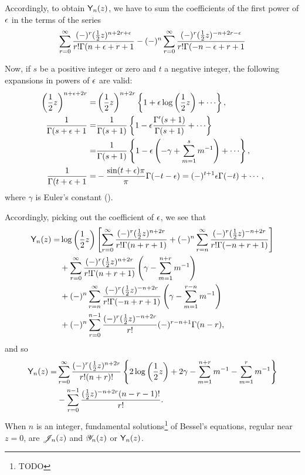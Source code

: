 \documentclass{book}
\begin{document}
Accordingly, to obtain $\mathsf{Y}_n(z)$, we have to sum the
coefficients of the first power of $\epsilon$ in the terms of the
series
$$
\sum_{r=0}^{\infty}
\frac{(-)^r (\frac{1}{2} z)^{n+2r+\epsilon}}{r! \Gamma(n+\epsilon+r+1}
-
(-)^n
\sum_{r=0}^{\infty}
\frac{(-)^r (\frac{1}{2} z)^{-n+2r -\epsilon}}{r! \Gamma(-n-\epsilon+r+1}
$$

Now, if $s$ be a positive integer or zero and $t$ a negative
integer, the following expansions in powers of $\epsilon$ are valid:
\begin{align*}
  \theparen{\half z}^{n+\eps+2r}
  =& \theparen{\half z}^{n+2r}
  \thebrace{1 + \eps\log\theparen{\half z} + \cdots},
  \\
  \frac{1}{\Gamma(s+\eps+1}
  =&
  \frac{1}{\Gamma(s+1)}
  \thebrace{
    1 - \eps \frac{\Gamma'(s+1)}{\Gamma(s+1)} + \cdots
  }
  \\
  =&
  \frac{1}{\Gamma(s+1)}
  \thebrace{
    1 - \eps\theparen{-\gamma + \sum_{m=1}^{s} m^{-1}} + \cdots
  },
  \\
  \frac{1}{\Gamma(t+\eps+1}
  =&
  - \frac{\sin(t+\eps)\pi}{\pi}
  \Gamma(-t-\eps)
  =
  (-)^{t+1} \eps \Gamma(-t) + \cdots,
\end{align*}
where $\gamma$ is Euler's constant ().

% 
% 
Accordingly, picking out the coefficient of $\epsilon$, we see that
\begin{align*}
  \mathsf{Y}_n(z)
  =&
  \log\left( \frac{1}{2} z \right)
  \left[ 
    \sum_{r=0}^{\infty}
    \frac{(-)^r (\frac{1}{2} z)^{n+2r}}{r! \Gamma(n+r+1)}
    + (-)^n \sum_{r=n}^{\infty} \frac{(-)^r (\frac{1}{2} z)^{-n+2r}}{r! \Gamma(-n+r+1)}
   \right]
  \\
  &
  + \sum_{r=0}^{\infty}
  \frac{(-)^r (\frac{1}{2} z)^{n+2r}}{r! \Gamma(n+r+1)}
  \left( \gamma - \sum_{m=1}^{n+r} m^{-1} \right)
  \\
  &
  + (-)^n
  \sum_{r=n}^{\infty}
  \frac{(-)^r (\frac{1}{2} z)^{-n+2r}}{r! \Gamma(-n+r+1)}
  \left( \gamma - \sum_{m=1}^{r-n} m^{-1} \right)
  \\
  &
  + (-)^n
  \sum_{r=0}^{n-1}
  \frac{ (-)^r (\frac{1}{2} z)^{-n+2r}}{r!}
  (-)^{r-n+1} \Gamma(n-r),
\end{align*}
and so
\begin{align*}
  \mathsf{Y}_n(z)
  =&
  \sum_{r=0}^{\infty}
  \frac{(-)^r (\frac{1}{2} z)^{n+2r}}{r!(n+r)!}
  \left\{ 
    2 \log\left( \frac{1}{2} z \right)
    + 2\gamma
    - \sum_{m=1}^{n+r} m^{-1}
    - \sum_{m=1}^r m^{-1}
   \right\}
  \\
  & - \sum_{r=0}^{n-1} \frac{(\frac{1}{2} z)^{-n+2r} (n-r-1)!}{r!}.
\end{align*}
When $n$ is an integer, fundamental solutions\footnote{TODO} of
Bessel's equations, regular near $z=0$, are $\mathscr{J}_n(z)$ and $\mathscr{Y}_n(z)$ or
$\mathsf{Y}_n(z)$.
\end{document}
